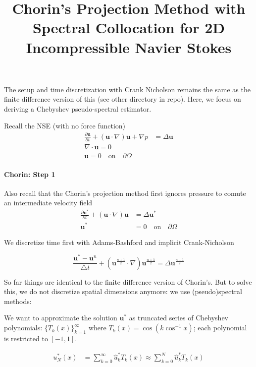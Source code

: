 \documentclass[12pt]{article}
\begin{document}
\title{Chorin's Projection Method with Spectral Collocation for 2D Incompressible Navier Stokes}
\maketitle

The setup and time discretization with Crank Nicholson remains the same as the finite difference version of this (see other directory in repo). Here, we focus on deriving a Chebyshev pseudo-spectral estimator.

Recall the NSE (with no force function)
\begin{align*}
    \frac{\partial \mathbf{u}}{\partial t} + (\mathbf{u}\cdot \nabla)\mathbf{u} + \nabla p &= \Delta \mathbf{u} \\
    \nabla \cdot \mathbf{u} = 0 \\
    \mathbf{u} = 0 \quad\text{on}\quad \partial \Omega
\end{align*}

\paragraph{Chorin: Step 1} Also recall that the Chorin's projection method first ignores pressure to comute an intermediate velocity field
\begin{align*}
    \frac{\partial \mathbf{u}^*}{\partial t} + (\mathbf{u}\cdot \nabla)\mathbf{u} &= \Delta \mathbf{u}^* \\
    \mathbf{u}^* &= 0 \quad\text{on}\quad \partial \Omega
\end{align*}

We discretize time first with Adams-Bashford and implicit Crank-Nicholson

\begin{equation*}
    \frac{\mathbf{u}^* - \mathbf{u}^n}{\bigtriangleup t} + (\mathbf{u}^{\frac{n+1}{2}} \cdot \nabla) \mathbf{u}^{\frac{n+1}{2}} = \Delta \mathbf{u}^{\frac{n+1}{2}}
\end{equation*}

So far things are identical to the finite difference version of Chorin's. But to solve this, we do not discretize spatial dimensions anymore: we use (pseudo)spectral methods:

We want to approximate the solution $\mathbf{u}^*$ as truncated series of Chebyshev polynomials: $\{ T_k(x) \}_{k=1}^{\infty}$ where $T_k(x) = \cos(k \cos^{-1}x)$; each polynomial is restricted to $[-1, 1]$.

\begin{align*}
    u^*_{N}(x) &= \sum_{k=0}^{\infty} \hat{u}^*_k T_k(x) \approx \sum_{k=0}^{N} \hat{u}^*_k T_k(x)
\end{align*}
\end{document}

